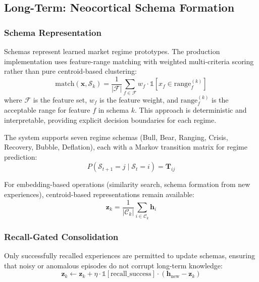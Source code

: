 \documentclass[12pt, a4paper]{article}
\begin{document}
\subsection{Long-Term: Neocortical Schema Formation}
\label{sec:neocortex}

\subsubsection{Schema Representation}

Schemas represent learned market regime prototypes. The production implementation uses feature-range matching with weighted multi-criteria scoring rather than pure centroid-based clustering:
\begin{equation}
	\text{match}(\mathbf{x}, \mathcal{S}_k) = \frac{1}{|\mathcal{F}|} \sum_{f \in \mathcal{F}} w_f \cdot \mathbb{1}[x_f \in \text{range}_f^{(k)}]
\end{equation}
where $\mathcal{F}$ is the feature set, $w_f$ is the feature weight, and $\text{range}_f^{(k)}$ is the acceptable range for feature $f$ in schema $k$. This approach is deterministic and interpretable, providing explicit decision boundaries for each regime.

The system supports seven regime schemas (Bull, Bear, Ranging, Crisis, Recovery, Bubble, Deflation), each with a Markov transition matrix for regime prediction:
\begin{equation}
	P(\mathcal{S}_{t+1} = j \mid \mathcal{S}_t = i) = \mathbf{T}_{ij}
\end{equation}

For embedding-based operations (similarity search, schema formation from new experiences), centroid-based representations remain available:
\begin{equation}
	\mathbf{z}_k = \frac{1}{|\mathcal{C}_k|} \sum_{i \in \mathcal{C}_k} \mathbf{h}_i
\end{equation}

\subsubsection{Recall-Gated Consolidation}

Only successfully recalled experiences are permitted to update schemas, ensuring that noisy or anomalous episodes do not corrupt long-term knowledge:
\begin{equation}
	\mathbf{z}_k \leftarrow \mathbf{z}_k + \eta \cdot \mathbb{1}[\text{recall\_success}] \cdot (\mathbf{h}_{\text{new}} - \mathbf{z}_k)
\end{equation}
\end{document}
